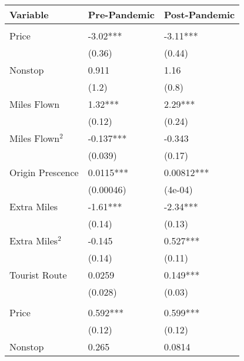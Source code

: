 
\begin{tabular}[t]{lll}
\toprule
Variable & Pre-Pandemic & Post-Pandemic\\
\midrule
\addlinespace[0.3em]
\multicolumn{3}{l}{\textbf{Linear Coefficients}}\\
\hspace{1em}Price & -3.02*** & -3.11***\\
\hspace{1em} & (0.36) & (0.44)\\
\hspace{1em}Nonstop & 0.911 & 1.16\\
\hspace{1em} & (1.2) & (0.8)\\
\hspace{1em}Miles Flown & 1.32*** & 2.29***\\
\hspace{1em} & (0.12) & (0.24)\\
\hspace{1em}Miles Flown$^2$ & -0.137*** & -0.343\\
\hspace{1em} & (0.039) & (0.17)\\
\hspace{1em}Origin Prescence & 0.0115*** & 0.00812***\\
\hspace{1em} & (0.00046) & (4e-04)\\
\hspace{1em}Extra Miles & -1.61*** & -2.34***\\
\hspace{1em} & (0.14) & (0.13)\\
\hspace{1em}Extra Miles$^2$ & -0.145 & 0.527***\\
\hspace{1em} & (0.14) & (0.11)\\
\hspace{1em}Tourist Route & 0.0259 & 0.149***\\
\hspace{1em} & (0.028) & (0.03)\\
\midrule
\addlinespace[0.3em]
\multicolumn{3}{l}{\textbf{Nonlinear Coefficients}}\\
\hspace{1em}Price & 0.592*** & 0.599***\\
\hspace{1em} & (0.12) & (0.12)\\
\hspace{1em}Nonstop & 0.265 & 0.0814\\

\end{tabular}
